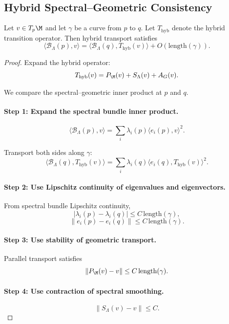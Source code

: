 \subsection{Hybrid Spectral--Geometric Consistency}

\begin{lemma}
Let $v \in T_p\M$ and let $\gamma$ be a curve from $p$ to $q$.  
Let $T_{\mathrm{hyb}}$ denote the hybrid transition operator.  
Then hybrid transport satisfies
\[
\langle \mathcal{B}_\Lambda(p), v \rangle
=
\langle \mathcal{B}_\Lambda(q), T_{\mathrm{hyb}}(v) \rangle
+ O(\mathrm{length}(\gamma)).
\]
\end{lemma}

\begin{proof}
Expand the hybrid operator:
\[
T_{\mathrm{hyb}}(v)
=
P_\M(v)
+
S_\Lambda(v)
+
A_G(v).
\]

We compare the spectral--geometric inner product at $p$ and $q$.

\paragraph{Step 1: Expand the spectral bundle inner product.}
\[
\langle \mathcal{B}_\Lambda(p), v \rangle
=
\sum_i \lambda_i(p) \langle e_i(p), v \rangle^2.
\]

Transport both sides along $\gamma$:
\[
\langle \mathcal{B}_\Lambda(q), T_{\mathrm{hyb}}(v) \rangle
=
\sum_i \lambda_i(q)
\langle e_i(q), T_{\mathrm{hyb}}(v) \rangle^2.
\]

\paragraph{Step 2: Use Lipschitz continuity of eigenvalues and eigenvectors.}
From spectral bundle Lipschitz continuity,
\[
|\lambda_i(p) - \lambda_i(q)| \le C\, \mathrm{length}(\gamma),
\]
\[
\|e_i(p) - e_i(q)\| \le C\, \mathrm{length}(\gamma).
\]

\paragraph{Step 3: Use stability of geometric transport.}
Parallel transport satisfies
\[
\|P_\M(v) - v\| \le C\, \mathrm{length}(\gamma).
\]

\paragraph{Step 4: Use contraction of spectral smoothing.}
\[
\|S_\Lambda(v) - v\| \le C.
\]


\end{proof}
